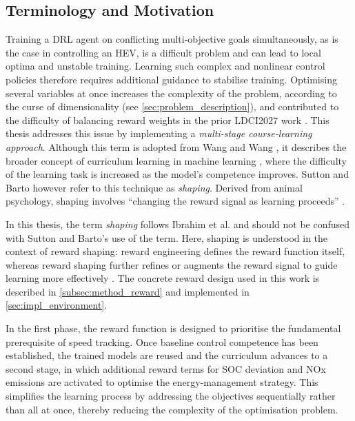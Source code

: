 \subsection{Terminology and Motivation}
\label{subsec:method_staged_terminology}
Training a \ac{DRL} agent on conflicting multi-objective goals simultaneously, as is the case in controlling an \ac{HEV}, is a difficult problem and can lead to local optima and unstable training. Learning such complex and nonlinear control policies therefore requires additional guidance to stabilise training. Optimising several variables at once increases the complexity of the problem, according to the curse of dimensionality (see \autoref{sec:problem_description}), and contributed to the difficulty of balancing reward weights in the prior \ac{LDCI2027} work \cite{cuberos_munoz_developing_2025}. This thesis addresses this issue by implementing a \textit{multi-stage course-learning approach}. Although this term is adopted from Wang and Wang \cite{wang_energy_2025}, it describes the broader concept of curriculum learning in machine learning \cite{bengio_curriculum_2009}, where the difficulty of the learning task is increased as the model's competence improves. Sutton and Barto \cite{sutton_reinforcement_2020} however refer to this technique as \textit{shaping}. Derived from animal psychology, shaping involves ``changing the reward signal as learning proceeds'' \cite{sutton_reinforcement_2020}.

In this thesis, the term \textit{shaping} follows Ibrahim et al. \cite{ibrahim_comprehensive_2024} and should not be confused with Sutton and Barto's use of the term. Here, shaping is understood in the context of reward shaping: reward engineering defines the reward function itself, whereas reward shaping further refines or augments the reward signal to guide learning more effectively \cite{ibrahim_comprehensive_2024}. The concrete reward design used in this work is described in \autoref{subsec:method_reward} and implemented in \autoref{sec:impl_environment}.

In the first phase, the reward function is designed to prioritise the fundamental prerequisite of speed tracking. Once baseline control competence has been established, the trained models are reused and the curriculum advances to a second stage, in which additional reward terms for \ac{SOC} deviation and \ac{NOx} emissions are activated to optimise the energy-management strategy. This simplifies the learning process by addressing the objectives sequentially rather than all at once, thereby reducing the complexity of the optimisation problem.

